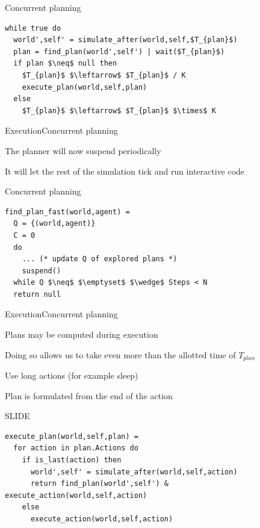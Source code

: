\documentclass{beamer}
\begin{document}
\begin{frame}[fragile]{Concurrent planning}
\begin{lstlisting}
while true do
  world',self' = simulate_after(world,self,$T_{plan}$)
  plan = find_plan(world',self') | wait($T_{plan}$)
  if plan $\neq$ null then
    $T_{plan}$ $\leftarrow$ $T_{plan}$ / K
    execute_plan(world,self,plan)
  else
    $T_{plan}$ $\leftarrow$ $T_{plan}$ $\times$ K
\end{lstlisting}
\end{frame}

\begin{slide}{Execution}{Concurrent planning}{
\item The planner will now suspend periodically
\item It will let the rest of the simulation tick and run interactive code
}\end{slide}

\begin{frame}[fragile]{Concurrent planning}
\begin{lstlisting}
find_plan_fast(world,agent) =
  Q = {(world,agent)}
  C = 0
  do
    ... (* update Q of explored plans *)
    suspend()
  while Q $\neq$ $\emptyset$ $\wedge$ Steps < N
  return null
\end{lstlisting}
\end{frame}

\begin{slide}{Execution}{Concurrent planning}{
\item Plans may be computed during execution
\item Doing so allows us to take even more than the allotted time of $T_{plan}$
\item Use long actions (for example sleep)
\item Plan is formulated from the end of the action
}\end{slide}

\begin{frame}[fragile]{SLIDE}
\begin{lstlisting}
execute_plan(world,self,plan) =
  for action in plan.Actions do
    if is_last(action) then
      world',self' = simulate_after(world,self,action)
      return find_plan(world',self') & execute_action(world,self,action)
    else
      execute_action(world,self,action)
\end{lstlisting}
\end{frame}
\end{document}
